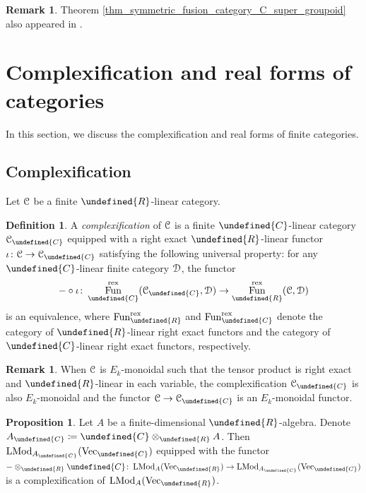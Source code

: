 \documentclass[10pt]{article}
\let\mathbb\undefined
\theoremstyle{definition}
\newtheorem{prop}[thm]{Proposition}
\newtheorem{defn}[thm]{Definition}
\newtheorem{rem}[thm]{Remark}
\numberwithin{equation}{section}
\numberwithin{thm}{section}
\newcommand{\Cb}{\mathbb{C}}
\newcommand{\Rb}{\mathbb{R}}
\newcommand{\CC}{\EuScript{C}}
\newcommand{\CD}{\EuScript{D}}
\DeclareMathOperator{\fun}{Fun}
\DeclareMathOperator{\LMod}{LMod}
\newcommand{\vect}{\mathrm{Vec}}
\begin{document}
\begin{rem}
Theorem \ref{thm_symmetric_fusion_category_C_super_groupoid} also appeared in \cite[Theorem 2.79]{DHJ+24}.
\end{rem}

\section{Complexification and real forms of categories} \label{sec_Galois_descent}


In this section, we discuss the complexification and real forms of finite categories.

\subsection{Complexification}

Let $\CC$ be a finite $\Rb$-linear category.

\begin{defn}
A \emph{complexification} of $\CC$ is a finite $\Cb$-linear category $\CC_\Cb$ equipped with a right exact $\Rb$-linear functor $\iota \colon \CC \to \CC_\Cb$ satisfying the following universal property: for any $\Cb$-linear finite category $\CD$, the functor
\[
- \circ \iota \colon \fun_\Cb^{\mathrm{rex}}(\CC_\Cb,\CD) \to \fun_\Rb^{\mathrm{rex}}(\CC,\CD)
\]
is an equivalence, where $\fun_\Rb^{\mathrm{rex}}$ and $\fun_\Cb^{\mathrm{rex}}$ denote the category of $\Rb$-linear right exact functors and the category of $\Cb$-linear right exact functors, respectively.
\end{defn}

\begin{rem}
When $\CC$ is $E_k$-monoidal such that the tensor product is right exact and $\Rb$-linear in each variable, the complexification $\CC_\Cb$ is also $E_k$-monoidal and the functor $\CC \to \CC_\Cb$ is an $E_k$-monoidal functor.
\end{rem}

\begin{prop} \label{prop_complexification_algebra}
Let $A$ be a finite-dimensional $\Rb$-algebra. Denote $A_\Cb \coloneqq \Cb \otimes_\Rb A$. Then $\LMod_{A_\Cb}(\vect_\Cb)$ equipped with the functor $- \otimes_\Rb \Cb \colon \LMod_A(\vect_\Rb) \to \LMod_{A_\Cb}(\vect_\Cb)$ is a complexification of $\LMod_A(\vect_\Rb)$.
\end{prop}
\end{document}
